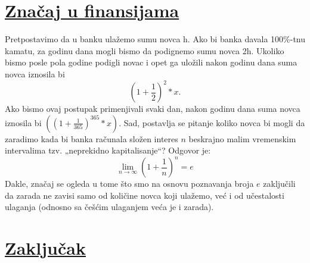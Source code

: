 \documentclass{article}
\begin{document}
\section*{\uline{Značaj u finansijama}}
Pretpostavimo da u banku ulažemo sumu novca h. Ako bi banka davala 100\%-tnu kamatu,
za godinu dana mogli bismo da podignemo sumu novca 2h. Ukoliko bismo posle pola
godine podigli novac i opet ga uložili nakon godinu dana suma novca iznosila bi
\begin{equation} (1+\frac{1}{2})^2*x. \end{equation}
Ako bismo ovaj postupak primenjivali svaki dan, nakon godinu dana suma novca
iznosila bi $((1+\frac{1}{365})^{365}*x)$. Sad, postavlja se pitanje koliko novca bi mogli da zaradimo kada bi banka računala složen interes $n$ beskrajno malim vremenskim intervalima tzv. „neprekidno kapitalisanje“? Odgovor je:
\begin{equation} \lim_{n \rightarrow \infty} (1+\frac{1}{n})^n=e \end{equation}
Dakle, značaj se ogleda u tome što smo na osnovu poznavanja broja $e$ zaključili da zarada ne zavisi samo od količine novca koji ulažemo, već i od učestalosti ulaganja (odnosno sa češćim ulaganjem veća je i zarada).\cite{alas}
\section*{\uline {Zaključak}}
\paragraph{}
\end{document}
